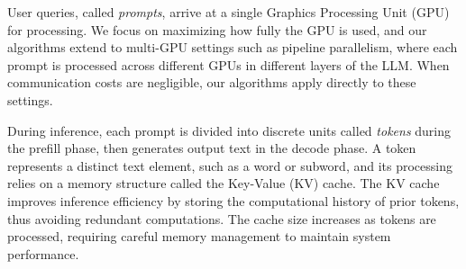 User queries, called \textit{prompts}, arrive at a single Graphics Processing Unit (GPU) for processing. We focus on maximizing how fully the GPU is used, and our algorithms extend to multi-GPU settings such as pipeline parallelism, where each prompt is processed across different GPUs in different layers of the LLM. When communication costs are negligible, our algorithms apply directly to these settings. 

During inference, each prompt is divided into discrete units called \textit{tokens} during the prefill phase, then generates output text in the decode phase. A token represents a distinct text element, such as a word or subword, and its processing relies on a memory structure called the Key-Value (KV) cache. The KV cache improves inference efficiency by storing the computational history of prior tokens, thus avoiding redundant computations. The cache size increases as tokens are processed, requiring careful memory management to maintain system performance.




